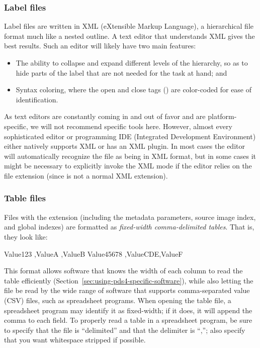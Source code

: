 \subsubsection{Label files}
\label{sec:label-files}

Label files are written in XML (eXtensible Markup Language), a hierarchical file format much like a nested outline. A text editor that understands XML gives the best results. Such an editor will likely have two main features:

\begin{itemize}
\item The ability to collapse and expand different levels of the hierarchy, so as to hide parts of the label that are not needed for the task at hand; and
\item Syntax coloring, where the open and close tags () are color-coded for ease of identification.
\end{itemize}
As text editors are constantly coming in and out of favor and are platform-specific, we will not recommend specific tools here. However, almost every sophisticated editor or programming IDE (Integrated Development Environment) either natively supports XML or has an XML plugin. In most cases the editor will automatically recognize the file as being in XML format, but in some cases it might be necessary to explicitly invoke the XML mode if the editor relies on the file extension (since  is not a normal XML extension).


\subsubsection{Table files}
\label{sec:table-files}

Files with the extension  (including the metadata parameters, source image index, and global indexes) are formatted as \textit{fixed-width comma-delimited tables}. That is, they look like:

\begin{CodeBlock}
Value123   ,ValueA  ,ValueB
Value45678 ,ValueCDE,ValueF
\end{CodeBlock}

This format allows software that knows the width of each column to read the table efficiently (Section~\ref{sec:using-pds4-specific-software}), while also letting the file be read by the wide range of software that supports comma-separated value (CSV) files, such as spreadsheet programs. When opening the table file, a spreadsheet program may identify it as fixed-width; if it does, it will append the comma to each field. To properly read a table in a spreadsheet program, be sure to specify that the file is “delimited” and that the delimiter is “,”; also specify that you want whitespace stripped if possible.


